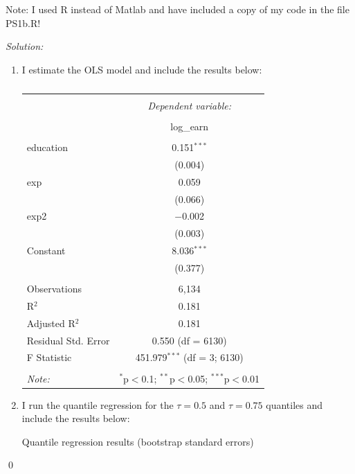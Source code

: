\documentclass[12pt]{article}
\newenvironment{problem}[2][Problem]{\begin{trivlist}
\item[\hskip \labelsep {\bfseries #1}\hskip \labelsep {\bfseries #2.}]}{\end{trivlist}}
\newenvironment{sol}
    {\emph{Solution:}
    }
    {
    \qed
    }
\begin{document}
Note: I used R instead of Matlab and have included a copy of my code in the file PS1b.R! 

\begin{problem}{1}
\end{problem}
\begin{sol}
\begin{enumerate}[label=\alph*) ]
  \item I estimate the OLS model and include the results below:
  \begin{table}[!htbp] \centering 
    \caption{} 
    \label{} 
  \begin{tabular}{@{\extracolsep{5pt}}lc} 
  \\[-1.8ex]\hline 
  \hline \\[-1.8ex] 
   & \multicolumn{1}{c}{\textit{Dependent variable:}} \\ 
  \cline{2-2} 
  \\[-1.8ex] & log\_earn \\ 
  \hline \\[-1.8ex] 
   education & 0.151$^{***}$ \\ 
    & (0.004) \\ 
   exp & 0.059 \\ 
    & (0.066) \\ 
   exp2 & $-$0.002 \\ 
    & (0.003) \\ 
   Constant & 8.036$^{***}$ \\ 
    & (0.377) \\ 
  \hline \\[-1.8ex] 
  Observations & 6,134 \\ 
  R$^{2}$ & 0.181 \\ 
  Adjusted R$^{2}$ & 0.181 \\ 
  Residual Std. Error & 0.550 (df = 6130) \\ 
  F Statistic & 451.979$^{***}$ (df = 3; 6130) \\ 
  \hline 
  \hline \\[-1.8ex] 
  \textit{Note:}  & \multicolumn{1}{r}{$^{*}$p$<$0.1; $^{**}$p$<$0.05; $^{***}$p$<$0.01} \\ 
  \end{tabular} 
  \end{table} 
  \item I run the quantile regression for the $\tau = 0.5 $ and $\tau = 0.75$ quantiles and include the results below:
  \begin{table}[htbp]
    \centering
    \caption{Quantile regression results (bootstrap standard errors)}

\end{table}
\end{enumerate}
\end{sol}
\end{document}
